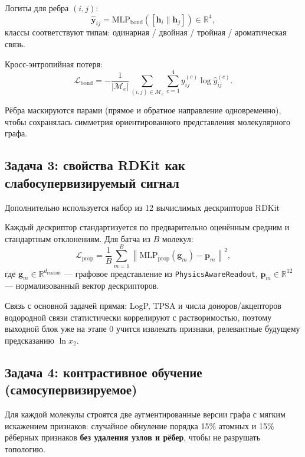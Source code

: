 \documentclass[11pt]{article}
\begin{document}
Логиты для ребра $(i,j)$:
\begin{equation*}
\hat{\mathbf{y}}_{ij} = \mathrm{MLP}_{\text{bond}}\!\left([\mathbf{h}_i \| \mathbf{h}_j]\right) \in \mathbb{R}^{4},
\end{equation*}
классы соответствуют типам: одинарная / двойная / тройная / ароматическая связь.

Кросс-энтропийная потеря:
\begin{equation*}
\mathcal{L}_{\text{bond}} = -\frac{1}{|\mathcal{M}_e|}\sum_{(i,j) \in \mathcal{M}_e}
\sum_{c=1}^{4} y_{ij}^{(c)}\log \hat{y}_{ij}^{(c)}.
\end{equation*}

Рёбра маскируются парами (прямое и обратное направление одновременно), чтобы сохранялась симметрия ориентированного представления молекулярного графа.

\subsection{Задача 3: свойства RDKit как слабосупервизируемый сигнал}

Дополнительно используется набор из 12 вычислимых дескрипторов RDKit

Каждый дескриптор стандартизуется по предварительно оценённым средним и стандартным отклонениям. Для батча из $B$ молекул:
\begin{equation*}
\mathcal{L}_{\text{prop}} = \frac{1}{B}\sum_{m=1}^{B}
\left\|\mathrm{MLP}_{\text{prop}}(\mathbf{g}_m)-\mathbf{p}_m\right\|^2,
\end{equation*}
где $\mathbf{g}_m \in \mathbb{R}^{d_{\text{readout}}}$ --- графовое представление из \texttt{PhysicsAwareReadout},
$\mathbf{p}_m \in \mathbb{R}^{12}$ --- нормализованный вектор дескрипторов.

Связь с основной задачей прямая: LogP, TPSA и числа доноров/акцепторов водородной связи статистически коррелируют с растворимостью, поэтому выходной блок уже на этапе 0 учится извлекать признаки, релевантные будущему предсказанию $\ln x_2$.

\subsection{Задача 4: контрастивное обучение (самосупервизируемое)}

Для каждой молекулы строятся две аугментированные версии графа с мягким искажением признаков: случайное обнуление порядка 15\% атомных и 15\% рёберных признаков \textbf{без удаления узлов и рёбер}, чтобы не разрушать топологию.
\end{document}
